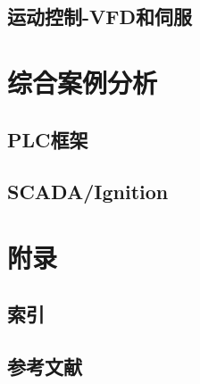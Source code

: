 \documentclass{book}
\begin{document}
	\section{运动控制-VFD和伺服} \lipsum[48-49]		
	
	\chapter{综合案例分析	} \lipsum[50-51] %

	\section{PLC框架} \lipsum[52-53]
	\section{SCADA/Ignition} \lipsum[54-55]
	\chapter{附录	} \lipsum[60-61] %
	\section{索引} \lipsum[62-63]
	\section{参考文献} \lipsum[64-65] 		
		
\end{document}
